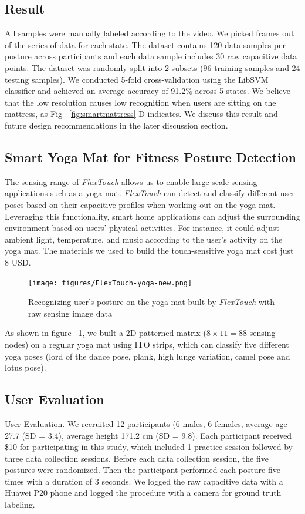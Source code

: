\subsection{Result}
All samples were manually labeled according to the video. We picked frames out of the series of data for each state. The dataset contains 120 data samples per posture across participants and each data sample includes 30 raw capacitive data points. The dataset was randomly split into 2 subsets (96 training samples and 24 testing samples). We conducted 5-fold cross-validation using the LibSVM classifier and achieved an average accuracy of 91.2\% across 5 states. We believe that the low resolution causes low recognition when users are sitting on the mattress, as Fig ~\ref{fig:smartmattress} D indicates. We discuss this result and future design recommendations in the later discussion section.   

\subsection{Smart Yoga Mat for Fitness Posture Detection}
The sensing range of \textit{FlexTouch} allows us to enable large-scale sensing applications such as a yoga mat.  \textit{FlexTouch} can detect and classify different user poses based on their capacitive profiles when working out on the yoga mat. Leveraging this functionality, smart home applications can adjust the surrounding environment based on users' physical activities. For instance, it could adjust ambient light, temperature, and music according to the user's activity on the yoga mat. The materials we used to build the touch-sensitive yoga mat cost just 8 USD. 

\begin{figure}[ht]
\centering
  \texttt{[image: figures/FlexTouch-yoga-new.png]}
  \caption{Recognizing user's posture on the yoga mat built by \textit{FlexTouch} with raw sensing image data}  \label{fig:yogamat}
\end{figure}

As shown in figure ~\ref{fig:yogamat}, we built a 2D-patterned matrix ($8\times11 = 88$ sensing nodes) on a regular yoga mat using ITO strips, which can classify five different yoga poses (lord of the dance pose, plank, high lunge variation, camel pose and lotus pose).

\subsection{User Evaluation}
User Evaluation. We recruited 12 participants (6 males, 6 females, average age 27.7 (SD = 3.4), average height 171.2 cm (SD = 9.8). Each participant received \$10 for participating in this study, which included 1 practice session followed by three data collection sessions. Before each data collection session, the five postures were randomized. Then the participant performed each posture five times with a duration of 3 seconds. We logged the raw capacitive data with a Huawei P20 phone and logged the procedure with a camera for ground truth labeling.

